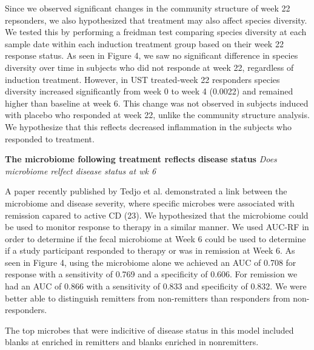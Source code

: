 \documentclass[11pt,]{article}
\begin{document}
Since we observed significant changes in the community structure of week
22 repsonders, we also hypothesized that treatment may also affect
species diversity. We tested this by performing a freidman test
comparing species diversity at each sample date within each induction
treatment group based on their week 22 response status. As seen in
Figure 4, we saw no significant difference in species diversity over
time in subjects who did not responde at week 22, regardless of
induction treatment. However, in UST treated-week 22 responders species
diversity increased significantly from week 0 to week 4 (0.0022) and
remained higher than baseline at week 6. This change was not observed in
subjects induced with placebo who responded at week 22, unlike the
community structure analysis. We hypothesize that this reflects
decreased inflammation in the subjects who responded to treatment.

\textbf{The microbiome following treatment reflects disease status}
\emph{Does microbiome relfect disease status at wk 6}

A paper recently published by Tedjo et al. demonstrated a link between
the microbiome and disease severity, where specific microbes were
associated with remission capared to active CD (23). We hypothesized
that the microbiome could be used to monitor response to therapy in a
similar manner. We used AUC-RF in order to determine if the fecal
microbiome at Week 6 could be used to determine if a study participant
responded to therapy or was in remission at Week 6. As seen in Figure 4,
using the microbiome alone we achieved an AUC of 0.708 for response with
a sensitivity of 0.769 and a specificity of 0.606. For remission we had
an AUC of 0.866 with a sensitivity of 0.833 and specificity of 0.832. We
were better able to distinguish remitters from non-remitters than
responders from non-responders.

The top microbes that were indicitive of disease status in this model
included blanks at enriched in remitters and blanks enriched in
nonremitters.
\end{document}
